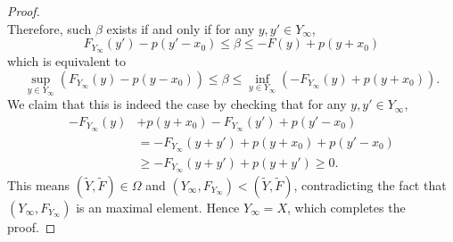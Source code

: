 \begin{proof}
\begin{equation*}
\end{equation*}
Therefore, such $\beta$ exists if and only if for any $y, y' \in Y_\infty$, 
\begin{equation*}
    F_{Y_\infty}(y') - p(y' - x_0) \le \beta \le -F(y) + p(y + x_0)
\end{equation*}
which is equivalent to 
\begin{equation*}
    \sup_{y \in Y_\infty} (F_{Y_\infty}(y) - p(y - x_0)) 
    \le \beta 
    \le \inf_{y \in Y_\infty} (-F_{Y_\infty}(y) + p(y + x_0)).
\end{equation*}
We claim that this is indeed the case by checking that for any 
$y, y' \in Y_\infty$, 
\begin{equation*}
    \begin{aligned}
        -F_{Y_\infty}(y) &+ p(y + x_0) 
            - F_{Y_\infty}(y') + p(y' - x_0) \\
        &= -F_{Y_\infty}(y + y') + p(y + x_0) + p(y' - x_0) \\
        &\ge -F_{Y_\infty}(y + y') + p(y + y') 
        \ge 0.
    \end{aligned}
\end{equation*}
This means $(\tilde Y, \tilde F) \in \Omega$ and $(Y_\infty, F_{Y_\infty})
< (\tilde Y, \tilde F)$, contradicting the fact that $(Y_\infty, 
F_{Y_\infty})$ is an maximal element. 
Hence $Y_\infty = X$, which completes the proof. 
\end{proof}


